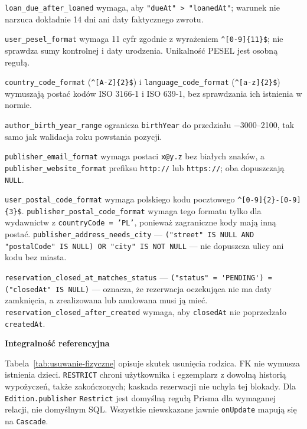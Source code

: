\documentclass[11pt, a4paper]{article}
\begin{document}
\texttt{loan\_due\_after\_loaned} wymaga, aby \verb|"dueAt" > "loanedAt"|; warunek nie narzuca dokładnie 14 dni ani daty faktycznego zwrotu.\par\noindent\texttt{user\_pesel\_format} wymaga 11 cyfr zgodnie z wyrażeniem \verb|^[0-9]{11}$|; nie sprawdza sumy kontrolnej i daty urodzenia. Unikalność PESEL jest osobną regułą.\par\noindent\texttt{country\_code\_format} (\verb|^[A-Z]{2}$|) i \texttt{language\_code\_format} (\verb|^[a-z]{2}$|) wymuszają postać kodów ISO 3166-1 i ISO 639-1, bez sprawdzania ich istnienia w normie.\par\noindent\texttt{author\_birth\_year\_range} ogranicza \texttt{birthYear} do przedziału $-3000$--2100, tak samo jak walidacja roku powstania pozycji.\par\noindent\texttt{publisher\_email\_format} wymaga postaci \texttt{x@y.z} bez białych znaków, a \texttt{publisher\_website\_format} prefiksu \texttt{http://} lub \texttt{https://}; oba dopuszczają \texttt{NULL}.\par\noindent\texttt{user\_postal\_code\_format} wymaga polskiego kodu pocztowego \verb|^[0-9]{2}-[0-9]{3}$|. \texttt{publisher\_postal\_code\_format} wymaga tego formatu tylko dla wydawnictw z \texttt{countryCode = 'PL'}, ponieważ zagraniczne kody mają inną postać. \texttt{publisher\_address\_needs\_city} --- \verb|("street" IS NULL AND "postalCode" IS NULL) OR "city" IS NOT NULL| --- nie dopuszcza ulicy ani kodu bez miasta.\par\noindent\texttt{reservation\_closed\_at\_matches\_status} --- \verb|("status" = 'PENDING') = ("closedAt" IS NULL)| --- oznacza, że rezerwacja oczekująca nie ma daty zamknięcia, a zrealizowana lub anulowana musi ją mieć. \texttt{reservation\_closed\_after\_created} wymaga, aby \texttt{closedAt} nie poprzedzało \texttt{createdAt}.

\noindent\textbf{Integralność referencyjna}

Tabela~\ref{tab:usuwanie-fizyczne} opisuje skutek usunięcia rodzica. FK nie wymusza istnienia dzieci. \texttt{RESTRICT} chroni użytkownika i egzemplarz z dowolną historią wypożyczeń, także zakończonych; kaskada rezerwacji nie uchyla tej blokady. Dla \texttt{Edition.publisher} \texttt{Restrict} jest domyślną regułą Prisma dla wymaganej relacji, nie domyślnym SQL. Wszystkie niewskazane jawnie \texttt{onUpdate} mapują się na \texttt{Cascade}.~\cite{prisma-referential}
\end{document}
